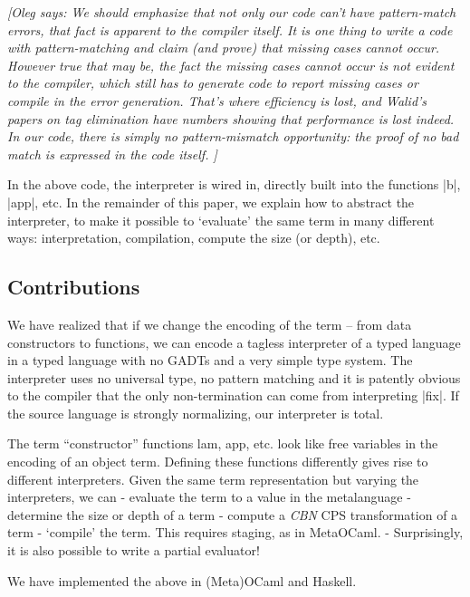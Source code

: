 \documentclass[preprint]{sigplanconf}
\newcommand{\oleg}[1]{{\it [Oleg says: #1]}}
\begin{document}
\oleg{
We should emphasize that not only our code can't have pattern-match
errors, that fact is apparent to the compiler itself. It is one thing
to write a code with pattern-matching and claim (and prove) that
missing cases cannot occur. However true that may be, the fact the
missing cases cannot occur is not evident to the compiler, which still
has to generate code to report missing cases or compile in the error
generation. That's where efficiency is lost, and Walid's papers on tag
elimination have numbers showing that performance is lost indeed. 
In our code, there is simply no pattern-mismatch opportunity: the
proof of no bad match is expressed in the code itself. }

In the above code, the interpreter is wired in, directly built into the
functions |b|, |app|, etc.  In the remainder of this paper, 
we explain how to abstract the interpreter,
to make it possible to `evaluate' the same term in many different
ways: interpretation, compilation, compute the size (or depth), etc.

\subsection{Contributions}\label{contributions}

        We have realized that if we change the encoding of the term --
from data constructors to functions, we can encode a tagless
interpreter of a typed language in a typed language with no GADTs and
a very simple type system. The interpreter uses no universal type, no
pattern matching and it is patently obvious to the compiler that the
only non-termination can come from interpreting |fix|. If the source
language is strongly normalizing, our interpreter is total.

The term ``constructor'' functions lam, app, etc. look like free
variables in the encoding of an object term.  Defining these functions
differently gives rise to different interpreters.  Given the same term
representation but varying the interpreters, we can
	- evaluate the term to a value in the metalanguage
	- determine the size or depth of a term
    - compute a \emph{CBN} CPS transformation of a term
	- `compile' the term. This requires staging, as in MetaOCaml.
	- Surprisingly, it is also possible to write a partial evaluator! 

We have implemented the above in (Meta)OCaml and Haskell.
\end{document}

